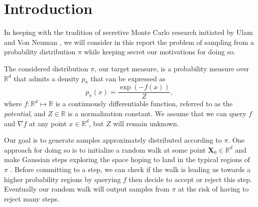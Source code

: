 \documentclass[10pt,journal,a4paper]{IEEEtran}
\theoremstyle{definition}
\newcommand{\R}{\mathbb{R}}
\newcommand{\bX}{\mathbf{X}}
\begin{document}
\maketitle


\IEEEdisplaynotcompsoctitleabstractindextext


%
\IEEEpeerreviewmaketitle


\section{Introduction}

In keeping with the tradition of secretive Monte Carlo research initiated by Ulam and Von Neuman \cite{eckhardt_stan_nodate}, we will consider in this report the problem of sampling from a probability distribution $\pi$ while keeping secret our motivations for doing so. 

The considered distribution $\pi$, our target measure, is a probability measure over $\R^d$ that admits a density $p_\pi$ that can be expressed as
\[
p_\pi(x) = \frac{\exp{\left(-f(x)\right)}}{Z},
\]
where $f: \R^d \mapsto \R$ is a continuously differentiable function, referred to as the \textit{potential}, and $Z \in \R$ is a normalization constant. We assume that we can query $f$ and $\nabla f$ at any point $x \in \R^d$, but $Z$ will remain unknown.

Our goal is to generate samples approximately distributed according to $\pi$. One approach for doing so is to initialize a random walk at some point $\bX_0 \in \R^d$ and make Gaussian steps exploring the space hoping to land in the typical regions of $\pi$ \cite{sherlock_random_2010}. Before committing to a step, we can check if the walk is leading us towards a higher probability regions by querying $f$ then decide to accept or reject this step. Eventually our random walk will output samples from $\pi$ at the risk of having to reject many steps. 
\end{document}
